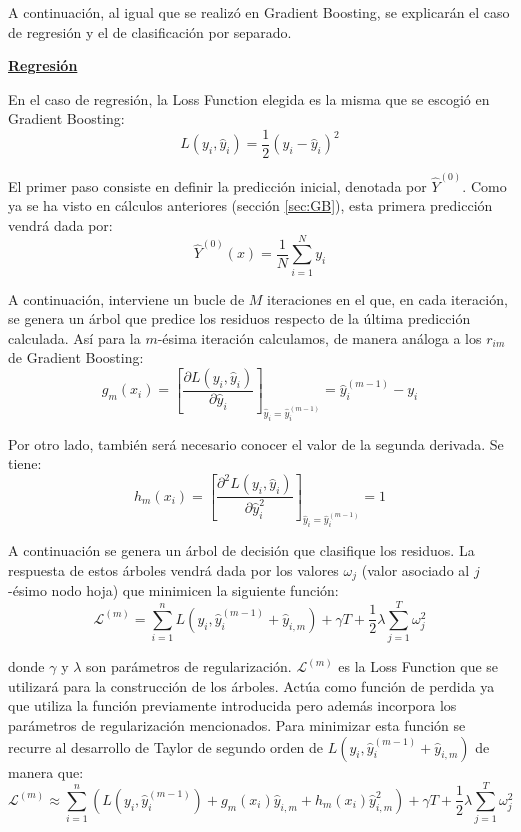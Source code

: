 \documentclass[12pt,twoside]{article}
\begin{document}
A continuación, al igual que se realizó en Gradient Boosting, se explicarán el caso de regresión y el de clasificación por separado.



\bigskip \bigskip

\textbf{\underline{Regresión}}

En el caso de regresión, la Loss Function elegida es la misma que se escogió en Gradient Boosting:
\begin{equation*}
L(y_i, \hat{y}_i) = \frac{1}{2}(y_i - \hat{y}_i)^2
\end{equation*}

El primer paso consiste en definir la predicción inicial, denotada por $\hat{Y}^{(0)}$. Como ya se ha visto en cálculos anteriores (sección \ref{sec:GB}), esta primera predicción vendrá dada por:
\begin{equation*}
\hat{Y}^{(0)}(x) = \frac{1}{N} \sum_{i=1}^N y_i
\end{equation*}

A continuación, interviene un bucle de $M$ iteraciones en el que, en cada iteración, se genera un árbol que predice los residuos respecto de la última predicción calculada. Así para la $m$-ésima iteración calculamos, de manera análoga a los $r_{im}$ de Gradient Boosting:
\begin{equation*}
g_{m}(x_i) = \left[ \frac{\partial L(y_i, \hat{y}_i)}{\partial \hat{y}_i} \right]_{\hat{y}_i = \hat{y}_i^{(m-1)}} = \hat{y}_i^{(m-1)} - y_i
\end{equation*}

Por otro lado, también será necesario conocer el valor de la segunda derivada. Se tiene:
\begin{equation*}
h_{m}(x_i) = \left[ \frac{\partial^2 L(y_i, \hat{y}_i)}{\partial \hat{y}_i^2} \right]_{\hat{y}_i = \hat{y}_i^{(m-1)}} = 1
\end{equation*}

A continuación se genera un árbol de decisión que clasifique los residuos. La respuesta de estos árboles vendrá dada por los valores $\omega_j$ (valor asociado al $j$-ésimo nodo hoja) que minimicen la siguiente función:
\begin{equation*}
\mathcal{L}^{(m)} = \sum_{i=1}^n L(y_i, \hat{y}_i^{(m-1)} + \hat{y}_{i,m}) + \gamma T + \frac{1}{2}\lambda \sum_{j=1}^T \omega_j^2
\end{equation*}

\noindent
donde $\gamma$ y $\lambda$ son parámetros de regularización. $\mathcal{L}^{(m)}$ es la Loss Function que se utilizará para la construcción de los árboles. Actúa como función de perdida ya que utiliza la función previamente introducida pero además incorpora los parámetros de regularización mencionados. Para minimizar esta función se recurre al desarrollo de Taylor de segundo orden de $L(y_i, \hat{y}_i^{(m-1)} + \hat{y}_{i,m})$ de manera que:
\begin{equation*}
\mathcal{L}^{(m)} \approx \sum_{i=1}^n \left( L(y_i, \hat{y}_i^{(m-1)}) + g_m(x_i)\hat{y}_{i, m} + h_m(x_i)\hat{y}_{i, m}^2 \right)  + \gamma T + \frac{1}{2}\lambda \sum_{j=1}^T \omega_j^2
\end{equation*}
\end{document}
